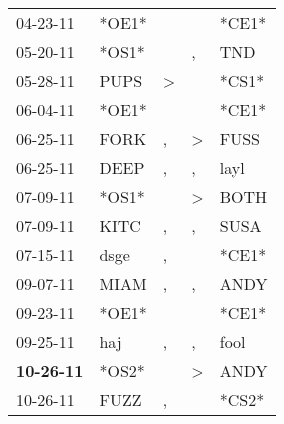 \begin{supertabular}{p{0.07\textwidth}p{0.06\textwidth}p{0.02\textwidth}p{0.02\textwidth}p{0.06\textwidth}}
          04-23-11\textsuperscript{} &                            *OE1* &                  &                  &                            *CE1* \\
          05-20-11\textsuperscript{} &                            *OS1* &                  &                , &            TND\textsuperscript{} \\
          05-28-11\textsuperscript{} &           PUPS\textsuperscript{} &     \textgreater &                  &                            *CS1* \\
          06-04-11\textsuperscript{} &                            *OE1* &                  &                  &                            *CE1* \\
          06-25-11\textsuperscript{} &           FORK\textsuperscript{} &                , &     \textgreater &           FUSS\textsuperscript{} \\
          06-25-11\textsuperscript{} &           DEEP\textsuperscript{} &                , &                , &           layl\textsuperscript{} \\
          07-09-11\textsuperscript{} &                            *OS1* &                  &     \textgreater &           BOTH\textsuperscript{} \\
          07-09-11\textsuperscript{} &           KITC\textsuperscript{} &                , &                , &           SUSA\textsuperscript{} \\
          07-15-11\textsuperscript{} &           dsge\textsuperscript{} &                , &                  &                            *CE1* \\
          09-07-11\textsuperscript{} &           MIAM\textsuperscript{} &                , &                , &           ANDY\textsuperscript{} \\
          09-23-11\textsuperscript{} &                            *OE1* &                  &                  &                            *CE1* \\
          09-25-11\textsuperscript{} &            haj\textsuperscript{} &                , &                , &           fool\textsuperscript{} \\
 \textbf{10-26-11\textsuperscript{}} &                            *OS2* &                  &     \textgreater &           ANDY\textsuperscript{} \\
          10-26-11\textsuperscript{} &           FUZZ\textsuperscript{} &                , &                  &                            *CS2* \\

\end{supertabular}
